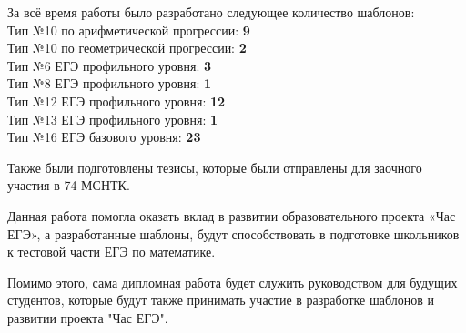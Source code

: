 За всё время работы было разработано следующее количество шаблонов:
\\Тип №10 по арифметической прогрессии: \textbf{9}
\\Тип №10 по геометрической прогрессии: \textbf{2}
\\Тип №6 ЕГЭ профильного уровня: \textbf{3}
\\Тип №8 ЕГЭ профильного уровня: \textbf{1}
\\Тип №12 ЕГЭ профильного уровня: \textbf{12}
\\Тип №13 ЕГЭ профильного уровня: \textbf{1}
\\Тип №16 ЕГЭ базового уровня: \textbf{23}

Также были подготовлены тезисы, которые были отправлены для заочного участия в 74 МСНТК.

Данная работа помогла оказать вклад в развитии образовательного проекта «Час ЕГЭ», а разработанные шаблоны, будут способствовать в подготовке школьников к тестовой части ЕГЭ по математике. 

Помимо этого, сама дипломная работа будет служить руководством для будущих студентов, которые будут также принимать участие в разработке шаблонов и развитии проекта "Час ЕГЭ".


